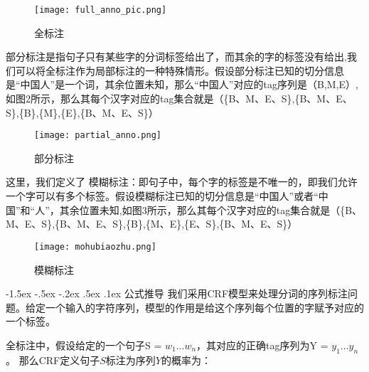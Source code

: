 \documentclass[a4paper, 11pt]{article}
\makeatletter
\newcommand{\sihao}{\fontsize{14pt}{\baselineskip}\selectfont}
\renewcommand\section{\@startsection{section}{1}{\z@}%
{-1.5ex \@plus -.5ex \@minus -.2ex}%
{.5ex \@plus .1ex}%
{\normalfont\sihao\CJKfamily{hei}}}
\makeatother
\begin{document}
\begin{figure}[htbp]
  \centering
  \texttt{[image: full\_anno\_pic.png]}
  \caption{全标注}\label{fig:digit}
\end{figure}

\newpage

部分标注是指句子只有某些字的分词标签给出了，而其余的字的标签没有给出,我们可以将全标注作为局部标注的一种特殊情形。假设部分标注已知的切分信息是“中国人”是一个词，其余位置未知，那么“中国人”对应的tag序列是（B,M,E）,如图2所示，那么其每个汉字对应的tag集合就是（\{B、M、E、S\},\{B、M、E、S\},\{B\},\{M\},\{E\},\{B、M、E、S\}）
\newline
\newline
\begin{figure}[htbp]
  \centering
  \texttt{[image: partial\_anno.png]}
  \caption{部分标注}\label{fig:digit}
\end{figure}
\newline
\newline

这里，我们定义了 模糊标注：即句子中，每个字的标签是不唯一的，即我们允许一个字可以有多个标签。假设模糊标注已知的切分信息是“中国人”或者“中国”和“人”，其余位置未知,如图3所示，那么其每个汉字对应的tag集合就是（\{B、M、E、S\},\{B、M、E、S\},\{B\},\{M、E\},\{E、S\},\{B、M、E、S\}）
\newline
\newline
\begin{figure}[htbp]
  \centering
  \texttt{[image: mohubiaozhu.png]}
  \caption{模糊标注}\label{fig:digit}
\end{figure}
\newline
\newline

\section{ 公式推导}
我们采用CRF模型来处理分词的序列标注问题。给定一个输入的字符序列，模型的作用是给这个序列每个位置的字赋予对应的一个标签。

\newpage
全标注中，假设给定的一个句子S = $w_1$...$w_n$，其对应的正确tag序列为Y = $y_1$...$y_n$。 
那么CRF定义句子$S$标注为序列$Y$的概率为：
\end{document}
